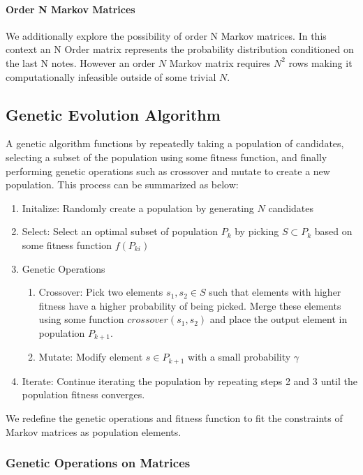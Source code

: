\documentclass{article}
\begin{document}
\paragraph{Order N Markov Matrices} We additionally explore the possibility of order N Markov matrices. In this context an N Order matrix represents the probability distribution conditioned on the last N notes. However an order $N$ Markov matrix requires $N^2$ rows making it computationally infeasible outside of some trivial $N$.

\subsection{Genetic Evolution Algorithm}

A genetic algorithm functions by repeatedly taking a population of candidates, selecting a subset of the population using some fitness function, and finally performing genetic operations such as crossover and mutate to create a new population. This process can be summarized as below:

\begin{enumerate}
\item Initalize: Randomly create a population by generating $N$ candidates
\item Select: Select an optimal subset of population $P_k$ by picking $S \subset P_k$ based on some fitness function $f(P_{ki})$
\item Genetic Operations
  \begin{enumerate}
  \item Crossover: Pick two elements $s_1, s_2 \in S$ such that elements with higher fitness have a higher probability of being picked. Merge these elements using some function $crossover(s_1, s_2)$ and place the output element in population $P_{k + 1}$.
  \item Mutate: Modify element $s \in P_{k + 1}$ with a small probability $\gamma$
  \end{enumerate}
\item Iterate: Continue iterating the population by repeating steps 2 and 3 until the population fitness converges.
\end{enumerate}

We redefine the genetic operations and fitness function to fit the constraints of Markov matrices as population elements.

\subsubsection{Genetic Operations on Matrices}
\end{document}
